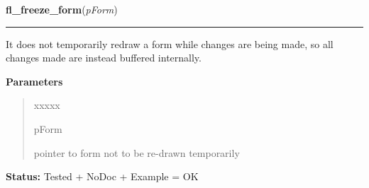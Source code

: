 \hspace{.8\funcindent}\begin{boxedminipage}{\funcwidth}

    \raggedright \textbf{fl\_freeze\_form}(\textit{pForm})

    \vspace{-1.5ex}

    \rule{\textwidth}{0.5\fboxrule}
\setlength{\parskip}{2ex}
    It does not temporarily redraw a form while changes are being made, so 
    all changes made are instead buffered internally.

\setlength{\parskip}{1ex}
      \textbf{Parameters}
      \vspace{-1ex}

      \begin{quote}
        \begin{Ventry}{xxxxx}

          \item[pForm]

          pointer to form not to be re-drawn temporarily

        \end{Ventry}

      \end{quote}

\textbf{Status:} Tested + NoDoc + Example = OK



    \end{boxedminipage}

    \label{xformslib:library:fl_set_focus_object}

    \vspace{0.5ex}

